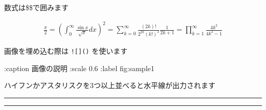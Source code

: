 \documentclass[a4j]{jarticle}
\begin{document}
数式は\$\$で囲みます

\begin{eqnarray*}
\frac{\pi}{2}
= \left( \int_{0}^{\infty} \frac{\sin x}{\sqrt{x}} dx \right)^2 
= \sum_{k=0}^{\infty} \frac{(2k)!}{2^{2k}(k!)^2} \frac{1}{2k+1} 
= \prod_{k=1}^{\infty} \frac{4k^2}{4k^2 - 1}
\end{eqnarray*}

画像を埋め込む際は {\tt ![]()} を使います


 :caption 画像の説明 :scale 0.6 :label fig:sample1 \fi

ハイフンかアスタリスクを3つ以上並べると水平線が出力されます

\begin{center}
\rule{3in}{0.4pt}
\end{center}

\begin{center}
\rule{3in}{0.4pt}
\end{center}
\end{document}
